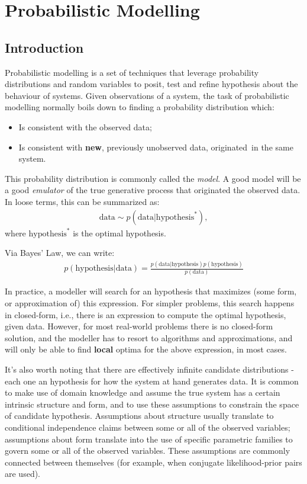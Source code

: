 \chapter{Probabilistic Modelling}
\label{chapter:probmodel}

\section{Introduction}
\label{section:probmodelintro}
Probabilistic modelling is a set of techniques that leverage probability
distributions and random variables to posit, test and refine hypothesis about
the behaviour of systems. Given observations of a system, the task of probabilistic
modelling normally boils down to finding a probability distribution which:
\begin{itemize}
    \item Is consistent with the observed data;
    \item Is consistent with \textbf{new}, previously unobserved data, originated\
        in the same system.
\end{itemize}

This probability distribution is commonly called the \emph{model}. A good model
will be a good \emph{emulator} of the true generative process that originated
the observed data. In loose terms, this can be summarized as:
\begin{align}
    \mbox{data} \sim p(\mbox{data}|\mbox{hypothesis}^*),
\end{align} where $\text{hypothesis}^*$ is the optimal hypothesis.

Via Bayes' Law, we can write:
\begin{align}
    p(\mbox{hypothesis}|\mbox{data}) = \frac{p(\mbox{data}|\mbox{hypothesis})p(\mbox{hypothesis})}{p(\mbox{data})} \label{eq:bayes}
\end{align}

In practice, a modeller will search for an hypothesis that maximizes (some form,
or approximation of) this expression. For simpler problems, this search happens
in closed-form, i.e., there is an expression to compute the optimal hypothesis,
given data. However, for most real-world problems there is no closed-form solution,
and the modeller has to resort to algorithms and approximations, and will only
be able to find \textbf{local} optima for the above expression, in most cases.

It's also worth noting that there are effectively infinite candidate distributions -
each one an hypothesis for how the system at hand generates data. It is common
to make use of domain knowledge and assume the true system has a certain intrinsic
structure and form, and to use these assumptions to constrain the space of
candidate hypothesis. Assumptions about structure usually translate to conditional
independence claims between some or all of the observed variables; assumptions
about form translate into the use of specific parametric families to govern some
or all of the observed variables. These assumptions are commonly connected between
themselves (for example, when conjugate likelihood-prior pairs are used).

